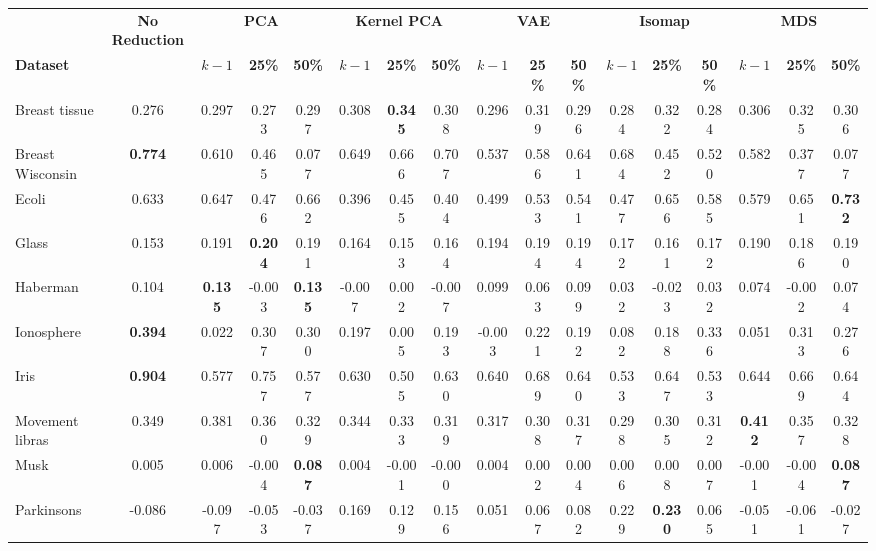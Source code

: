 \begin{tabular}{lcccccccccccccccc}
\toprule
 & \textbf{No Reduction} & \multicolumn{3}{c}{\textbf{PCA}} & \multicolumn{3}{c}{\textbf{Kernel PCA}} & \multicolumn{3}{c}{\textbf{VAE}} & \multicolumn{3}{c}{\textbf{Isomap}} & \multicolumn{3}{c}{\textbf{MDS}} \\
\cmidrule(lr){3-5} \cmidrule(lr){6-8} \cmidrule(lr){9-11} \cmidrule(lr){12-14} \cmidrule(lr){15-17}
\textbf{Dataset} &  & \textbf{$k-1$} & \textbf{25\%} & \textbf{50\%} & \textbf{$k-1$} & \textbf{25\%} & \textbf{50\%} & \textbf{$k-1$} & \textbf{25\%} & \textbf{50\%} & \textbf{$k-1$} & \textbf{25\%} & \textbf{50\%} & \textbf{$k-1$} & \textbf{25\%} & \textbf{50\%} \\
\midrule
Breast tissue & 0.276 & 0.297 & 0.273 & 0.297 & 0.308 & \textbf{0.345} & 0.308 & 0.296 & 0.319 & 0.296 & 0.284 & 0.322 & 0.284 & 0.306 & 0.325 & 0.306 \\
Breast Wisconsin & \textbf{0.774} & 0.610 & 0.465 & 0.077 & 0.649 & 0.666 & 0.707 & 0.537 & 0.586 & 0.641 & 0.684 & 0.452 & 0.520 & 0.582 & 0.377 & 0.077 \\
Ecoli & 0.633 & 0.647 & 0.476 & 0.662 & 0.396 & 0.455 & 0.404 & 0.499 & 0.533 & 0.541 & 0.477 & 0.656 & 0.585 & 0.579 & 0.651 & \textbf{0.732} \\
Glass & 0.153 & 0.191 & \textbf{0.204} & 0.191 & 0.164 & 0.153 & 0.164 & 0.194 & 0.194 & 0.194 & 0.172 & 0.161 & 0.172 & 0.190 & 0.186 & 0.190 \\
Haberman & 0.104 & \textbf{0.135} & -0.003 & \textbf{0.135} & -0.007 & 0.002 & -0.007 & 0.099 & 0.063 & 0.099 & 0.032 & -0.023 & 0.032 & 0.074 & -0.002 & 0.074 \\
Ionosphere & \textbf{0.394} & 0.022 & 0.307 & 0.300 & 0.197 & 0.005 & 0.193 & -0.003 & 0.221 & 0.192 & 0.082 & 0.188 & 0.336 & 0.051 & 0.313 & 0.276 \\
Iris & \textbf{0.904} & 0.577 & 0.757 & 0.577 & 0.630 & 0.505 & 0.630 & 0.640 & 0.689 & 0.640 & 0.533 & 0.647 & 0.533 & 0.644 & 0.669 & 0.644 \\
Movement libras & 0.349 & 0.381 & 0.360 & 0.329 & 0.344 & 0.333 & 0.319 & 0.317 & 0.308 & 0.317 & 0.298 & 0.305 & 0.312 & \textbf{0.412} & 0.357 & 0.328 \\
Musk & 0.005 & 0.006 & -0.004 & \textbf{0.087} & 0.004 & -0.001 & -0.000 & 0.004 & 0.002 & 0.004 & 0.006 & 0.008 & 0.007 & -0.001 & -0.004 & \textbf{0.087} \\
Parkinsons & -0.086 & -0.097 & -0.053 & -0.037 & 0.169 & 0.129 & 0.156 & 0.051 & 0.067 & 0.082 & 0.229 & \textbf{0.230} & 0.065 & -0.051 & -0.061 & -0.027 \\

\end{tabular}
